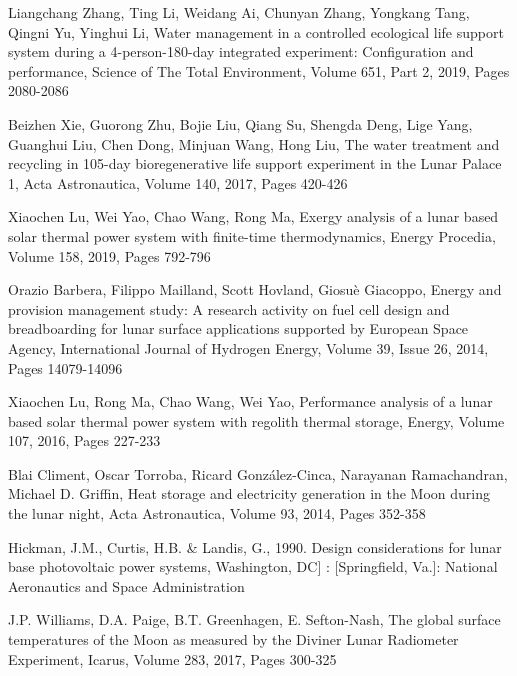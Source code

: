 \documentclass[prl,onecolumn]{revtex4-1}  %
\begin{document}
\begin{thebibliography}{99}

Liangchang Zhang, Ting Li, Weidang Ai, Chunyan Zhang, Yongkang Tang, Qingni Yu, Yinghui Li,
Water management in a controlled ecological life support system during a 4-person-180-day integrated experiment: Configuration and performance,
Science of The Total Environment,
Volume 651, Part 2,
2019,
Pages 2080-2086


Beizhen Xie, Guorong Zhu, Bojie Liu, Qiang Su, Shengda Deng, Lige Yang, Guanghui Liu, Chen Dong, Minjuan Wang, Hong Liu,
The water treatment and recycling in 105-day bioregenerative life support experiment in the Lunar Palace 1,
Acta Astronautica,
Volume 140,
2017,
Pages 420-426


Xiaochen Lu, Wei Yao, Chao Wang, Rong Ma,
Exergy analysis of a lunar based solar thermal power system with finite-time thermodynamics,
Energy Procedia,
Volume 158,
2019,
Pages 792-796


Orazio Barbera, Filippo Mailland, Scott Hovland, Giosuè Giacoppo,
Energy and provision management study: A research activity on fuel cell design and breadboarding for lunar surface applications supported by European Space Agency,
International Journal of Hydrogen Energy,
Volume 39, Issue 26,
2014,
Pages 14079-14096

Xiaochen Lu, Rong Ma, Chao Wang, Wei Yao,
Performance analysis of a lunar based solar thermal power system with regolith thermal storage,
Energy,
Volume 107,
2016,
Pages 227-233

Blai Climent, Oscar Torroba, Ricard González-Cinca, Narayanan Ramachandran, Michael D. Griffin,
Heat storage and electricity generation in the Moon during the lunar night,
Acta Astronautica,
Volume 93,
2014,
Pages 352-358

Hickman, J.M., Curtis, H.B. \& Landis, G., 1990. Design considerations for lunar base photovoltaic power systems, Washington, DC] : [Springfield, Va.]: National Aeronautics and Space Administration


J.P. Williams, D.A. Paige, B.T. Greenhagen, E. Sefton-Nash,
The global surface temperatures of the Moon as measured by the Diviner Lunar Radiometer Experiment,
Icarus,
Volume 283,
2017,
Pages 300-325



\end{thebibliography}
\end{document}
